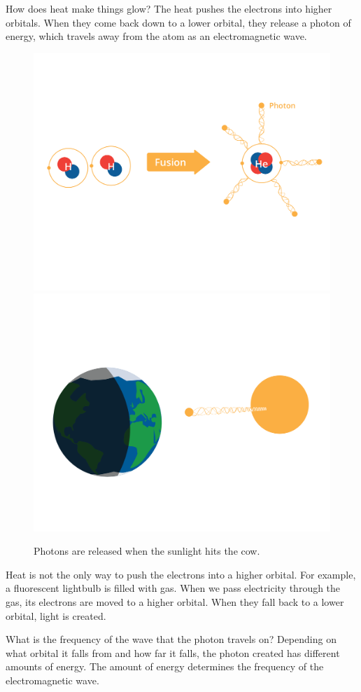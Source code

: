 How does heat make things glow? The heat pushes the electrons into
higher orbitals. When they come back down to a lower orbital, they
release a photon of energy, which travels away from the atom as an
electromagnetic wave.
\begin{figure}[htbp]
    \includegraphics[width=.5\textwidth]{cow2.png}
    \includegraphics[width=.5\textwidth]{cow3.png}
    \caption{Photons are released when the sunlight hits the cow.}
    \label{fig:photonreleases}
\end{figure}

Heat is not the only way to push the electrons into a higher
orbital. For example, a fluorescent lightbulb is filled with gas.
When we pass electricity through the gas, its electrons are moved to a
higher orbital. When they fall back to a lower orbital, light is created.

What is the frequency of the wave that the photon travels on?
Depending on what orbital it falls from and how far it falls, the
photon created has different amounts of energy. The amount of energy
determines the frequency of the electromagnetic wave.

